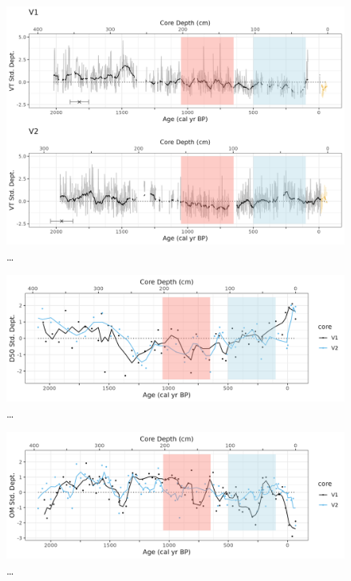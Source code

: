 \documentclass[
  letterpaper,
  DIV=11,
  numbers=noendperiod]{scrartcl}
\begin{document}
\begin{figure}

{\centering \includegraphics[width=1\textwidth,height=\textheight]{figs/V1_V2_varvethickness_vs_depth_and_C14_est_yr_ma.png}

}

\caption{\label{fig-varves-a}\ldots{}}

\end{figure}

\begin{figure}

{\centering \includegraphics[width=1\textwidth,height=\textheight]{figs/V1_V2_grainsize_vs_depth_and_C14_est_yr.png}

}

\caption{\label{fig-particle}\ldots{}}

\end{figure}

\begin{figure}

{\centering \includegraphics[width=1\textwidth,height=\textheight]{figs/V1_V2_LOI_vs_depth_and_C14_est_yr.png}

}

\caption{\label{fig-loi}\ldots{}}

\end{figure}
\end{document}
